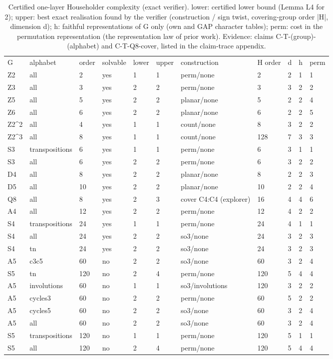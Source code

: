 \documentclass[10pt,twocolumn,a4paper]{article}
\begin{document}
\begin{table}[t]\centering\small\caption{Certified one-layer Householder complexity (exact verifier). lower: certified lower bound (Lemma L4 for 2); upper: best exact realisation found by the verifier (construction / sign twist, covering-group order |H|, dimension d); h: faithful representations of G only (own and GAP character tables); perm: cost in the permutation representation (the representation law of prior work). Evidence: claims C-T-(group)-(alphabet) and C-T-Q8-cover, listed in the claim-trace appendix.}
\begin{tabular}{lllllllllll}\hline
G & alphabet & order & solvable & lower & upper & construction & H order & d & h & perm \\
Z2 & all & 2 & yes & 1 & 1 & perm/none & 2 & 2 & 1 & 1 \\
Z3 & all & 3 & yes & 2 & 2 & perm/none & 3 & 3 & 2 & 2 \\
Z5 & all & 5 & yes & 2 & 2 & planar/none & 5 & 2 & 2 & 4 \\
Z6 & all & 6 & yes & 2 & 2 & planar/none & 6 & 2 & 2 & 5 \\
Z2\^{}2 & all & 4 & yes & 1 & 1 & count/none & 8 & 3 & 2 & 2 \\
Z2\^{}3 & all & 8 & yes & 1 & 1 & count/none & 128 & 7 & 3 & 3 \\
S3 & transpositions & 6 & yes & 1 & 1 & perm/none & 6 & 3 & 1 & 1 \\
S3 & all & 6 & yes & 2 & 2 & perm/none & 6 & 3 & 2 & 2 \\
D4 & all & 8 & yes & 2 & 2 & planar/none & 8 & 2 & 2 & 3 \\
D5 & all & 10 & yes & 2 & 2 & planar/none & 10 & 2 & 2 & 4 \\
Q8 & all & 8 & yes & 2 & 3 & cover C4:C4 (explorer) & 16 & 4 & 4 & 6 \\
A4 & all & 12 & yes & 2 & 2 & perm/none & 12 & 4 & 2 & 2 \\
S4 & transpositions & 24 & yes & 1 & 1 & perm/none & 24 & 4 & 1 & 1 \\
S4 & all & 24 & yes & 2 & 2 & so3/none & 24 & 3 & 2 & 3 \\
S4 & tn & 24 & yes & 2 & 2 & so3/none & 24 & 3 & 2 & 3 \\
A5 & c3c5 & 60 & no & 2 & 2 & so3/none & 60 & 3 & 2 & 4 \\
S5 & tn & 120 & no & 2 & 4 & perm/none & 120 & 5 & 4 & 4 \\
A5 & involutions & 60 & no & 1 & 1 & so3/involutions & 120 & 3 & 2 & 2 \\
A5 & cycles3 & 60 & no & 2 & 2 & perm/none & 60 & 5 & 2 & 2 \\
A5 & cycles5 & 60 & no & 2 & 2 & so3/none & 60 & 3 & 2 & 4 \\
A5 & all & 60 & no & 2 & 2 & so3/none & 60 & 3 & 2 & 4 \\
S5 & transpositions & 120 & no & 1 & 1 & perm/none & 120 & 5 & 1 & 1 \\
S5 & all & 120 & no & 2 & 4 & perm/none & 120 & 5 & 4 & 4 \\\hline
\end{tabular}\end{table}
\end{document}
